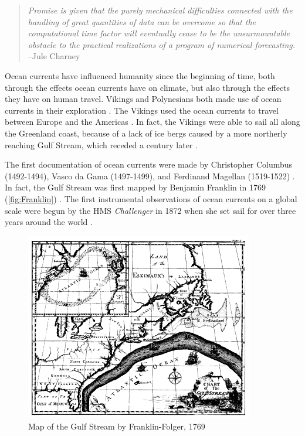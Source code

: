 \begin{quote}
\emph{Promise is given that the purely mechanical difficulties connected with the
handling of great quantities of data can be overcome so that the computational
time factor will eventually cease to be the unsurmountable obstacle to the
practical realizations of a program of numerical forecasting.} --Jule Charney
\end{quote}

Ocean currents have influenced humanity since the beginning of time, both
through the effects ocean currents have on climate, but also through the effects
they have on human travel. Vikings and Polynesians both made use of ocean
currents in their exploration \cite{Dijkstra08, Ingstad}. The Vikings used the
ocean currents to travel between Europe and the Americas \cite{Ingstad}. In
fact, the Vikings were able to sail all along the Greenland coast, because of a
lack of ice bergs caused by a more northerly reaching Gulf Stream, which receded
a century later \cite{Morner95}.

The first documentation of ocean currents were made by Christopher Columbus
(1492-1494), Vasco da Gama (1497-1499), and Ferdinand Magellan (1519-1522)
\cite{Dijkstra08, Vallis06}. In fact, the Gulf Stream was first mapped by
Benjamin Franklin in 1769 (\autoref{fig:Franklin}) \cite{Dijkstra08, Vallis06}.
The first instrumental observations of ocean currents on a global scale were
begun by the HMS \emph{Challenger} in 1872 when she set sail for over three
years around the world \cite{Siedler01}.

\begin{figure}%
  \begin{center}
    \includegraphics[scale=0.5]{Figures/Franklin-Folger.png}
    \caption{Map of the Gulf Stream by Franklin-Folger, 1769}
    \label{fig:Franklin}
  \end{center}
\end{figure}

